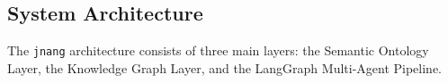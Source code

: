 \documentclass[pdflatex,sn-mathphys-num]{sn-jnl}%
\newcommand{\juhoansi}{\mbox{Ju\textbar{}'hoansi}}%
\theoremstyle{thmstyleone}%
\theoremstyle{thmstyletwo}%
\theoremstyle{thmstylethree}%
\begin{document}


\subsection{System Architecture}\label{sec:architecture}

The \texttt{jnang} architecture consists of three main layers: the Semantic Ontology Layer, the Knowledge Graph Layer, and the LangGraph Multi-Agent Pipeline.
\end{document}
